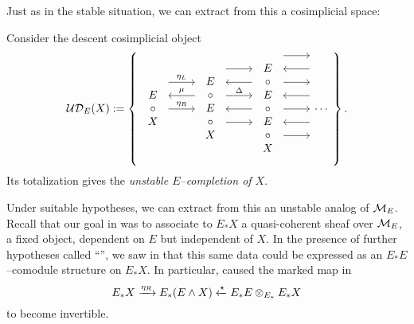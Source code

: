 Just as in the stable situation, we can extract from this a cosimplicial space:
\begin{definition}
Consider the descent cosimplicial object
\[\sheaf{UD}_E(X) := \left\{
\begin{tikzcd}
\begin{array}{c} E \\ \circ \\ X \end{array} \arrow[leftarrow, shift left=\baselineskip]{r}{\mu} \arrow[shift left=(2*\baselineskip)]{r}{\eta_L} \arrow{r}{\eta_R} &
\begin{array}{c} E \\ \circ \\ E \\ \circ \\ X \end{array} \arrow[shift left=(3*\baselineskip)]{r} \arrow[leftarrow, shift left=(2*\baselineskip)]{r} \arrow[shift left=\baselineskip]{r}{\Delta} \arrow[leftarrow]{r} \arrow[shift right=\baselineskip]{r} &
\begin{array}{c} E \\ \circ \\ E \\ \circ \\ E \\ \circ \\ X \end{array} \arrow[shift left=(4*\baselineskip)]{r} \arrow[leftarrow, shift left=(3*\baselineskip)]{r} \arrow[shift left=(2*\baselineskip)]{r} \arrow[leftarrow, shift left=\baselineskip]{r} \arrow{r} \arrow[leftarrow, shift right=\baselineskip]{r} \arrow[shift right=(2*\baselineskip)]{r} &
\cdots
\end{tikzcd}
\right\}.\]
Its totalization gives the \textit{unstable $E$--completion of $X$}.
\end{definition}

Under suitable hypotheses, we can extract from this an unstable analog of $\mathcal{M}_{E}$.  Recall that our goal in  was to associate to $E_* X$ a quasi-coherent sheaf over $\mathcal{M}_{E}$, a fixed object, dependent on $E$ but independent of $X$.  In the presence of further hypotheses called ``{\FH}'', we saw in  that this same data could be expressed as an $E_* E$--comodule structure on $E_* X$.  In particular, {\FH} caused the marked map in \[E_* X \xrightarrow{\eta_R} E_*(E \wedge X) \xleftarrow{\star} E_* E \otimes_{E_*} E_* X\] to become invertible.


